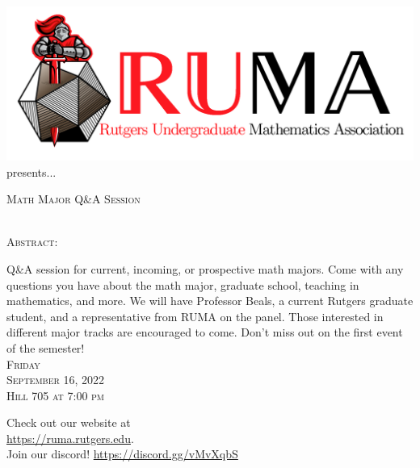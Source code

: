 \documentclass[12pt]{article}
\begin{document}

\begin{center}\includegraphics[scale=.45]{RUMAlogo.png}\\
\large  presents... \\

\vspace{2mm}
\begin{spacing}{1}
{\fontsize{40}{44}\selectfont  \textsc{
Math Major Q\&A Session}} \end{spacing}
 

 ~~\\

\normalsize
\textsc{Abstract:}

\LARGE 
Q\&A session for current, incoming, or prospective math
majors. Come with any questions you have about the math
major, graduate school, teaching in mathematics, and more. We will
have Professor Beals, a current Rutgers graduate student, and a representative from RUMA on the
panel. Those interested in different major tracks are encouraged
to come. Don't miss out on the first event of the semester!\\

\vspace{10mm} 
\Huge   \textsc{Friday\\September 16, 2022 \\Hill 705 at 7:00 pm}
\end{center}
\begin{center}
\Large  Check out our website at \\
\url{https://ruma.rutgers.edu}. \\Join our 
discord! \url{https://discord.gg/vMvXqbS}
\end{center}
\end{document}
